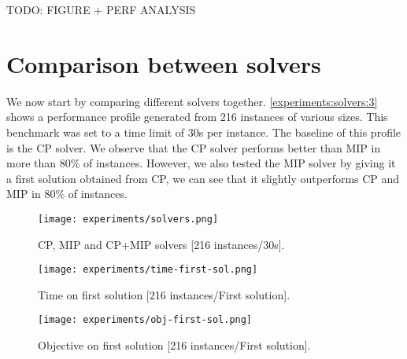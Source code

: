 \documentclass[../../thesis.tex]{subfiles}
\begin{document}
TODO: FIGURE + PERF ANALYSIS

\section{Comparison between solvers}

We now start by comparing different solvers together. \autoref{experiments:solvers:3} 
shows a performance profile generated from 216 instances of various sizes.
This benchmark was set to a time limit of 30s per instance. The baseline of this 
profile is the CP solver. We observe that the CP solver performs better than MIP in more than 80\% of instances.
However, we also tested the MIP solver by giving it a first solution obtained from CP, we can see that it slightly outperforms CP and MIP in 80\% of instances.

\begin{figure}
  \centering
  \texttt{[image: experiments/solvers.png]}
  \caption{CP, MIP and CP+MIP solvers [216 instances/30s].}
  \label{experiments:solvers:3}
\end{figure}


\begin{figure}
  \centering
  \texttt{[image: experiments/time-first-sol.png]}
  \caption{Time on first solution [216 instances/First solution].}
  \label{experiments:first-sol-time}
\end{figure}


\begin{figure}
  \centering
  \texttt{[image: experiments/obj-first-sol.png]}
  \caption{Objective on first solution [216 instances/First solution].}
  \label{experiments:first-sol-obj}
\end{figure}
\end{document}
